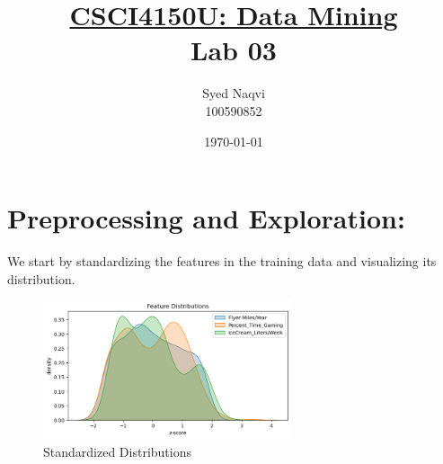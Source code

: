 \documentclass{article}
\title{\textbf{\underline{CSCI4150U: Data Mining}\\Lab 03}}
\author{Syed Naqvi\\100590852}
\date{\today}
\begin{document}
    \maketitle
    

    \section*{Preprocessing and Exploration:}

    We start by standardizing the features in the training data and visualizing its
    distribution.

    \begin{figure}[H]
        \centering
        \includegraphics[width=0.65\textwidth, height=0.25\textheight]{pre_a.png}
        \caption{\small{Standardized Distributions}}
    \end{figure}
\end{document}
